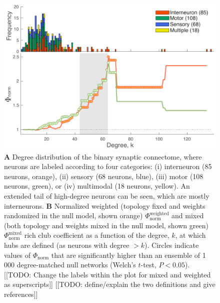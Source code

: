 \documentclass[10pt,letterpaper]{article}
\begin{document}
\begin{figure}[h]
\label{fig:S_weightedRC}
\centering
    \includegraphics[width=1\textwidth]{weightedRCALL.pdf}
    \caption{\textbf{A} Degree distribution of the binary synaptic connectome, where neurons are labeled according to four categories:
(i) interneuron (85 neurons, orange),
(ii) sensory (68 neurons, blue),
(iii) motor (108 neurons, green), or
(iv) multimodal (18 neurons, yellow).
An extended tail of high-degree neurons can be seen, which are mostly interneurons.
\textbf{B}
Normalized weighted (topology fixed and weights randomized in the null model, shown orange) $\Phi_\mathrm{norm}^\mathrm{weighted}$ and mixed (both topology and weights mixed in the null model, shown green) $\Phi_\mathrm{norm}^\mathrm{mixed}$ rich club coefficient as a function of the degree, $k$, at which hubs are defined (as neurons with degree $>k$).
Circles indicate values of $\Phi_\mathrm{norm}$ that are significantly higher than an ensemble of 1\,000 degree-matched null networks (Welch's $t$-test, $P < 0.05$).
[[TODO: Change the labels within the plot for mixed and weighted as superscripts]]
[[TODO: define/explain the two definitions and give references]]
}
\end{figure}
\end{document}

